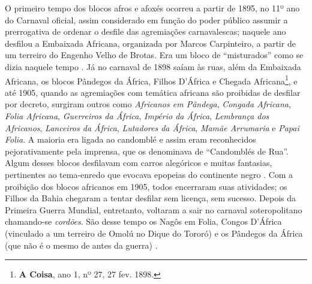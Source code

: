 O primeiro tempo dos blocos afros e afoxés ocorreu a partir de 1895, no 11º ano do Carnaval oficial, assim considerado em função do poder público assumir a prerrogativa de ordenar o desfile das agremiações carnavalescas; naquele ano desfilou a Embaixada Africana, organizada por Marcos Carpinteiro, a partir de um terreiro do Engenho Velho de Brotas. Era um bloco de ``misturados'' como se dizia naquele tempo \cite{cadena_doistemposafro_2017}. Já no carnaval de 1898 saíam às ruas, além da Embaixada Africana, os blocos Pândegos da África, Filhos D'África e Chegada Africana\footnote{\textbf{A Coisa}, ano 1, nº 27, 27 fev. 1898.}, e até 1905, quando as agremiações com temática africana são proibidas de desfilar por decreto, surgiram outros como \textit{Africanos em Pândega}, \textit{Congada Africana}, \textit{Folia Africana}, \textit{Guerreiros da África}, \textit{Império da África}, \textit{Lembrança dos Africanos}, \textit{Lanceiros da África}, \textit{Lutadores da África}, \textit{Mamãe Arrumaria} e \textit{Papai Folia}.  A maioria era ligada ao candomblé e assim eram reconhecidos pejorativamente pela imprensa, que os denominava de ``Candomblés de Rua''. Algum desses blocos desfilavam com carros alegóricos e muitas fantasias, pertinentes ao tema-enredo que evocava epopeias do continente negro \cite{cadena_doistemposafro_2017}. Com a proibição dos blocos africanos em 1905, todos encerraram suas atividades; os Filhos da Bahia chegaram a tentar desfilar sem licença, sem sucesso. Depois da Primeira Guerra Mundial, entretanto, voltaram a sair no carnaval soteropolitano chamando-se \textit{cordões}. São desse tempo os Nagôs em Folia, Congos D’África (vinculado a um terreiro de Omolú no Dique do Tororó)  e os Pândegos da África (que não é o mesmo de antes da guerra) \cite{cadena_doistemposafro_2017}.


